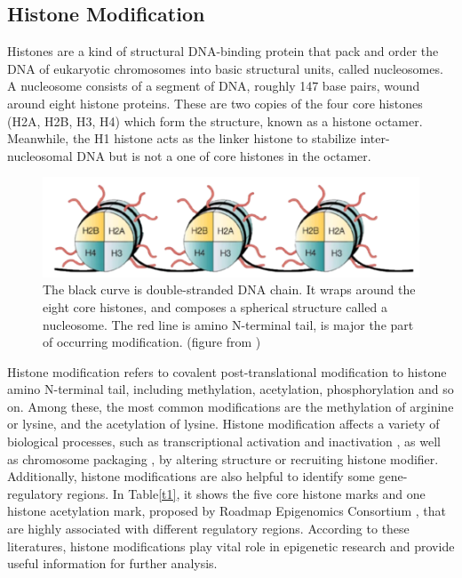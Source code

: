 \subsection{Histone Modification}
Histones are a kind of structural DNA-binding protein that pack and order the DNA of eukaryotic chromosomes into basic structural units, called nucleosomes. A nucleosome consists of a segment of DNA, roughly 147 base pairs, wound around eight histone proteins. These are two copies of the four core histones (H2A, H2B, H3, H4) which form the structure, known as a histone octamer. Meanwhile, the H1 histone acts as the linker histone to stabilize inter-nucleosomal DNA but is not a one of core histones in the octamer.

\begin{figure}[H]
    \centering
    \includegraphics[width=1\columnwidth]{body/figure/figure1.png}
    \captionsetup{labelfont=bf}
    \renewcommand{\baselinestretch}{1.0}
    \caption[Structure of nucleosome]{The black curve is double-stranded DNA chain. It wraps around the eight core histones, and composes a spherical structure called a nucleosome. The red line is amino N-terminal tail, is major the part of occurring modification. (figure from \cite{marks2001histone})}
    \label{f1}
\end{figure}

Histone modification refers to covalent post-translational modification to histone amino N-terminal tail, including methylation, acetylation, phosphorylation and so on. Among these, the most common modifications are the methylation of arginine or lysine, and the acetylation of lysine. Histone modification affects a variety of biological processes, such as transcriptional activation and inactivation \cite{luger1997crystal}, as well as chromosome packaging \cite{peterson2004histones}, by altering structure \cite{allfrey1964acetylation} or recruiting histone modifier. Additionally, histone modifications are also helpful to identify some gene-regulatory regions. In Table\ref{t1}, it shows the five core histone marks and one histone acetylation mark, proposed by Roadmap Epigenomics Consortium \cite{kundaje2015integrative}, that are highly associated with different regulatory regions. According to these literatures, histone modifications play vital role in epigenetic research and provide useful information for further analysis.


